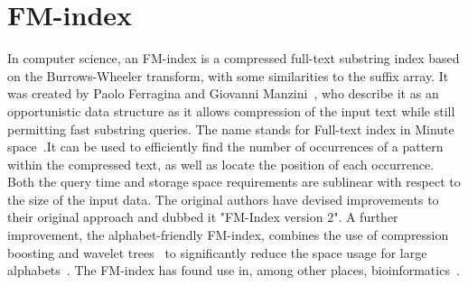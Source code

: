 \section{FM-index}
In computer science, an FM-index is a compressed full-text substring index based on the Burrows-Wheeler transform, with some similarities to the suffix array. It was created by Paolo Ferragina and Giovanni Manzini~\cite{Ferragina2000}, who describe it as an opportunistic data structure as it allows compression of the input text while still permitting fast substring queries. The name stands for Full-text index in Minute space~\cite{Ferragina2005}.It can be used to efficiently find the number of occurrences of a pattern within the compressed text, as well as locate the position of each occurrence. Both the query time and storage space requirements are sublinear with respect to the size of the input data. The original authors have devised improvements to their original approach and dubbed it "FM-Index version 2". A further improvement, the alphabet-friendly FM-index, combines the use of compression boosting and wavelet trees~\cite{Ferragina2004} to significantly reduce the space usage for large alphabets~\cite{wiki:FM-index}. The FM-index has found use in, among other places, bioinformatics~\cite{pmid20529929}.